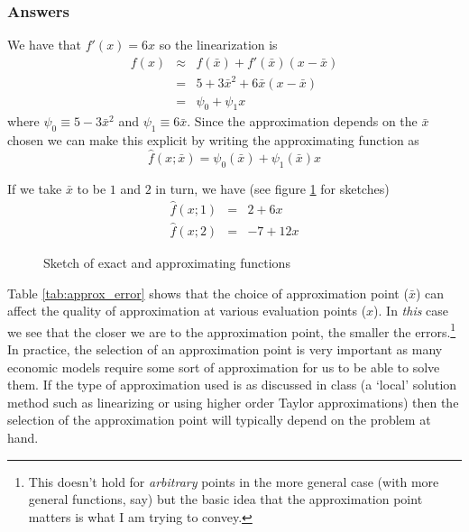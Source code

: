 \documentclass[authoryear,11pt]{elsarticle}
\begin{document}
\subsubsection*{Answers}
We have that $f'(x) = 6x$ so the linearization is
\begin{eqnarray*}
f(x) 	&\approx& f(\bar{x}) + f'(\bar{x})(x-\bar{x})	\\
	&=& 5+3\bar{x}^2+6\bar{x}(x-\bar{x})		\\
	&=& \psi_{0} + \psi_{1}x
\end{eqnarray*}
where $\psi_{0}\equiv5-3\bar{x}^2$ and $\psi_{1}\equiv 6\bar{x}$. Since the approximation depends on the $\bar{x}$ chosen we can make this explicit by writing the approximating function as
\[
\hat{f}(x;\bar{x}) = \psi_{0}(\bar{x}) + \psi_{1}(\bar{x}) x
\]

If we take $\bar{x}$ to be $1$ and $2$ in turn, we have (see figure \ref{fig:lin_diagram} for sketches)
\begin{eqnarray*}
\hat{f}(x;1) &=& 2 + 6x \\
\hat{f}(x;2) &=& -7 + 12x 
\end{eqnarray*}

\begin{figure}[!htb]
\caption{\label{fig:lin_diagram} Sketch of exact and approximating functions}
\end{figure}

Table \ref{tab:approx_error} shows that the choice of approximation point ($\bar{x}$) can affect the quality of approximation at various evaluation points ($x$). In \emph{this} case we see that the closer we are to the approximation point, the smaller the errors.\footnote{This doesn't hold for \emph{arbitrary} points in the more general case (with more general functions, say) but the basic idea that the approximation point matters is what I am trying to convey.} In practice, the selection of an approximation point is very important as many economic models require some sort of approximation for us to be able to solve them. If the type of approximation used is as discussed in class (a `local' solution method such as linearizing or using higher order Taylor approximations) then the selection of the approximation point will typically depend on the problem at hand.
\end{document}
